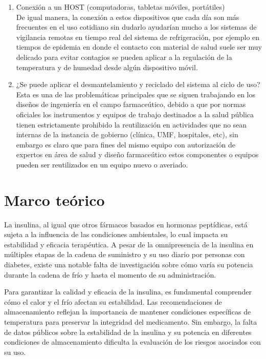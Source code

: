 \begin{enumerate}
\item	Conexión a un HOST (computadoras, tabletas móviles, portátiles)\\
De igual manera, la conexión a estos dispositivos que cada día son más frecuentes en el uso cotidiano sin dudarlo ayudarían mucho a los sistemas de vigilancia remotas en tiempo real del sistema de refrigeración, por ejemplo en tiempos de epidemia en donde el contacto con material de salud suele ser muy delicado para evitar contagios se pueden aplicar a la regulación de la temperatura y de humedad desde algún dispositivo móvil.



\item 	¿Se puede aplicar el desmantelamiento y reciclado del sistema al ciclo de uso?
Esta es una de las problemáticas principales que se siguen trabajando en los diseños de ingeniería en el campo farmaceútico, debido a que por normas oficiales los instrumentos y equipos de trabajo destinados a la salud pública tienen estrictamente prohibido la reutilización en actividades que no sean internas de la instancia de gobierno (clínica, UMF, hospitales, etc), sin embargo es claro que para fines del mismo equipo con autorización de expertos en área de salud y diseño farmaceútico estos componentes o equipos pueden ser reutilizados en un equipo nuevo o averiado.
	
\end{enumerate}


\section{Marco teórico }


La insulina, al igual que otros fármacos basados en hormonas peptídicas, está sujeta a la influencia de las condiciones ambientales, lo cual impacta su estabilidad y eficacia terapéutica. A pesar de la omnipresencia de la insulina en múltiples etapas de la cadena de suministro y su uso diario por personas con diabetes, existe una notable falta de investigación sobre cómo varía su potencia durante la cadena de frío y hasta el momento de su administración.

Para garantizar la calidad y eficacia de la insulina, es fundamental comprender cómo el calor y el frío afectan su estabilidad. Las recomendaciones de almacenamiento reflejan la importancia de mantener condiciones específicas de temperatura para preservar la integridad del medicamento. Sin embargo, la falta de datos públicos sobre la estabilidad de la insulina y su potencia en diferentes condiciones de almacenamiento dificulta la evaluación de los riesgos asociados con su uso.  \textcolor{white}{ } \cite{heinemann-2020}

